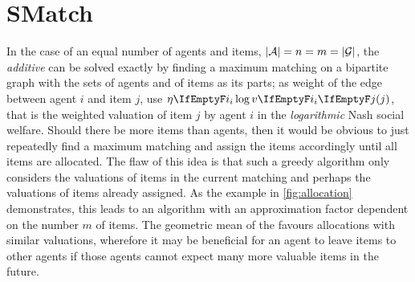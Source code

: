 \section{SMatch}

In the case of an equal number of agents and items, \ie{} \(\vert\mathcal{A}\vert = n = m = \vert\mathcal{G}\vert\), the \emph{additive} \NSW{} can be solved exactly by finding a maximum matching on a bipartite graph with the sets of agents and of items as its parts;
as weight of the edge between agent \(i\) and item \(j\), use \(\weight \log \valuations[j]\), that is the weighted valuation of item \(j\) by agent \(i\) in the \emph{logarithmic} Nash social welfare.
Should there be more items than agents, then it would be obvious to just repeatedly find a maximum matching and assign the items accordingly until all items are allocated.
The flaw of this idea is that such a greedy algorithm only considers the valuations of items in the current matching and perhaps the valuations of items already assigned.
As the example in \cref{fig:allocation} demonstrates, this leads to an algorithm with an approximation factor dependent on the number \(m\) of items.
The geometric mean of the \NSW{} favours allocations with similar valuations, wherefore it may be beneficial for an agent to leave items to other agents if those agents cannot expect many more valuable items in the future.

